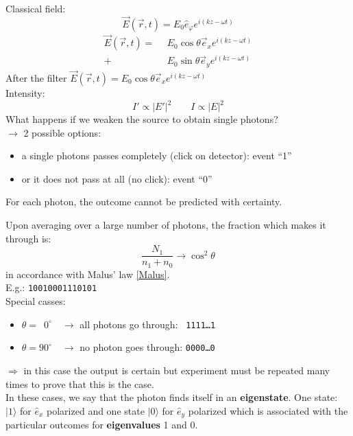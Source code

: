 \noindent
Classical field:
\begin{equation}
\vec{E}(\vec{r},t) = E_0 \hat{e}_{\varphi} e^{i (k z - \omega t)}
\end{equation}
\begin{align*}
\vec{E}(\vec{r},t) = \ \ & E_0 \cos \theta \vec{e}_x e^{i(kz - \omega t)}\\
+ & E_0 \sin \theta \vec{e}_{y} e^{i(kz - \omega t)}
\end{align*}
After the filter $ \vec{E}(\vec{r},t) = E_0 \cos\theta \vec{e}_{x}e^{i(kz - \omega t)} $\\
Intensity:
\begin{equation*}
I' \propto | E' |^2 \qquad I \propto | E | ^2
\end{equation*}
\noindent
What happens if we weaken the source to obtain single photons?\\
$ \rightarrow $ 2 possible options:
\begin{itemize}
	\item a single photons passes completely (click on detector): event ``1''
	\item or it does not pass at all (no click): event ``0''
\end{itemize}
For each photon, the outcome cannot be predicted with certainty.\par
Upon averaging over a large number of photons, the fraction which makes it through is:
\begin{equation*}
\frac{N_1}{n_1 + n_0} \to \cos^2 \theta
\end{equation*}
in accordance with Malus' law \eqref{Malus}.\\[10pt]
E.g.: \texttt{10010001110101}\\[5pt]
Special casses:
\begin{itemize}
	\item $ \theta = \phantom{0}0^\circ \quad \to $ all photons go through: $\phantom{1}$\texttt{1111\dots1}
	\item $ \theta = 90^\circ \quad \to $ no photon goes through: \texttt{0000\dots0}
\end{itemize}
$ \Rightarrow $ in this case the output is certain but experiment must be repeated many times to prove that this is the case.\\[10pt]
In these cases, we say that the photon finds itself in an \textbf{eigenstate}. One state: $ |1\rangle $ for $ \hat{e}_x $ polarized and one state $ |0\rangle $ for $ \hat{e}_y $ polarized which is associated with the particular outcomes for \textbf{eigenvalues} 1 and 0.